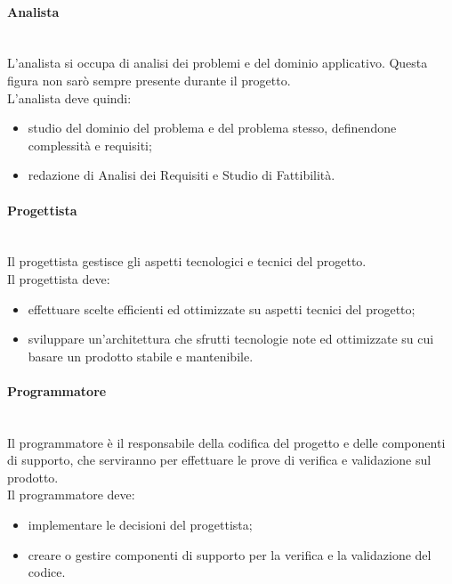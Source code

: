 			\paragraph{Analista} \mbox{}\\
			L'analista si occupa di analisi dei problemi e del dominio applicativo. Questa figura non sarò sempre presente durante il progetto. \\
			L'analista deve quindi:
			\begin{itemize}
				\item studio del dominio del problema e del problema stesso, definendone complessità e requisiti;
				\item redazione di Analisi dei Requisiti e Studio di Fattibilità.
			\end{itemize}
			\paragraph{Progettista} \mbox{}\\
			Il progettista gestisce gli aspetti tecnologici e tecnici del progetto.\\
			Il progettista deve:
			\begin{itemize}
				\item effettuare scelte efficienti ed ottimizzate su aspetti tecnici del progetto;
				\item sviluppare un'architettura che sfrutti tecnologie note ed ottimizzate su cui basare un prodotto stabile e mantenibile.
			\end{itemize}
			\paragraph{Programmatore} \mbox{}\\
			Il programmatore è il responsabile della codifica del progetto e delle componenti di supporto, che serviranno per effettuare le prove di verifica e validazione sul prodotto.\\
			Il programmatore deve:
			\begin{itemize}
				\item implementare le decisioni del progettista;
				\item creare o gestire componenti di supporto per la verifica e la validazione del codice.
			\end{itemize}
